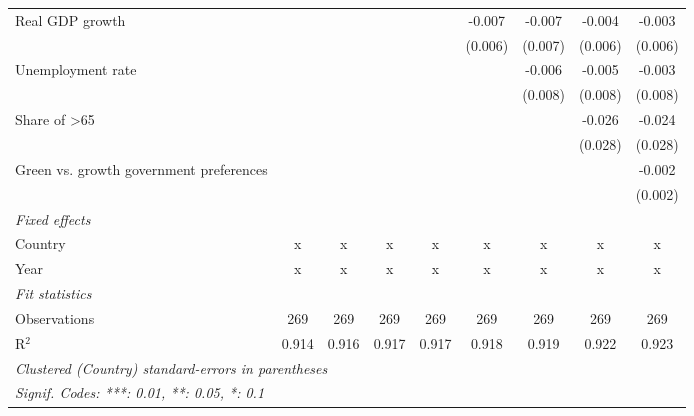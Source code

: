 \begin{table}[htbp]
\begin{tabular}{lcccccccc}
      Real GDP growth                                          &              &              &             &             & -0.007       & -0.007       & -0.004        & -0.003\\   
                                                               &              &              &             &             & (0.006)      & (0.007)      & (0.006)       & (0.006)\\   
      Unemployment rate                                        &              &              &             &             &              & -0.006       & -0.005        & -0.003\\   
                                                               &              &              &             &             &              & (0.008)      & (0.008)       & (0.008)\\   
      Share of >65                                             &              &              &             &             &              &              & -0.026        & -0.024\\   
                                                               &              &              &             &             &              &              & (0.028)       & (0.028)\\   
      Green vs. growth government preferences                  &              &              &             &             &              &              &               & -0.002\\   
                                                               &              &              &             &             &              &              &               & (0.002)\\   
      \emph{Fixed effects}\\
      Country                                                  & x            & x            & x           & x           & x            & x            & x             & x\\  
      Year                                                     & x            & x            & x           & x           & x            & x            & x             & x\\  
      \midrule \emph{Fit statistics}\\
      Observations                                             & 269          & 269          & 269         & 269         & 269          & 269          & 269           & 269\\  
      R$^2$                                                    & 0.914        & 0.916        & 0.917       & 0.917       & 0.918        & 0.919        & 0.922         & 0.923\\  
      \midrule
      \multicolumn{9}{l}{\emph{Clustered (Country) standard-errors in parentheses}}\\
      \multicolumn{9}{l}{\emph{Signif. Codes: ***: 0.01, **: 0.05, *: 0.1}}\\
   \end{tabular}
\end{table}


